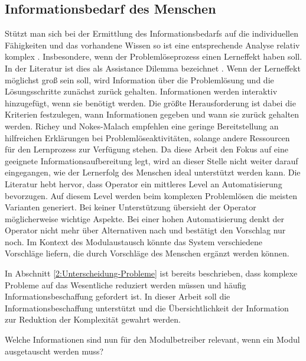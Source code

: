 \subsection{Informationsbedarf des Menschen}
\label{3:Informationsbedarf-Operator}
Stützt man sich bei der Ermittlung des Informationsbedarfs auf die individuellen Fähigkeiten und das vorhandene Wissen so ist eine entsprechende Analyse relativ komplex . Insbesondere, wenn der Problemlöseprozess einen Lerneffekt haben soll. In der Literatur ist dies als Assistance Dilemma bezeichnet . Wenn der Lerneffekt möglichst groß sein soll, wird Information über die Problemlösung und die Lösungsschritte zunächst zurück gehalten. Informationen werden interaktiv hinzugefügt, wenn sie benötigt werden. Die größte Herausforderung ist dabei die Kriterien festzulegen, wann Informationen gegeben und wann sie zurück gehalten werden\cite{Koedinger2007}.  Richey und Nokes-Malach \cite{Richey2013} empfehlen eine geringe Bereitstellung an hilfreichen Erklärungen bei Problemlöseaktivitäten, solange andere Ressourcen für den Lernprozess zur Verfügung stehen. Da diese Arbeit den Fokus auf eine geeignete Informationsaufbereitung legt, wird an dieser Stelle nicht weiter darauf eingegangen, wie der Lernerfolg des Menschen ideal unterstützt werden kann. Die Literatur \cite{Miller2005, Sauer2018} hebt hervor, dass Operator ein mittleres Level an Automatisierung bevorzugen. Auf diesem Level werden beim komplexen Problemlösen die meisten Varianten generiert. Bei keiner Unterstützung übersieht der Operator möglicherweise wichtige Aspekte. Bei einer hohen Automatisierung denkt der Operator nicht mehr über Alternativen nach und bestätigt den Vorschlag nur noch. \cite{Miller2005} Im Kontext des Modulaustausch könnte das System verschiedene Vorschläge liefern, die durch Vorschläge des Menschen ergänzt werden können.

In Abschnitt \ref{2:Unterscheidung-Probleme} ist bereits beschrieben, dass komplexe Probleme auf das Wesentliche reduziert werden müssen und häufig Informationsbeschaffung gefordert ist. In dieser Arbeit soll die Informationsbeschaffung unterstützt und die Übersichtlichkeit der Information zur Reduktion der Komplexität gewahrt werden.

Welche Informationen sind nun für den Modulbetreiber relevant, wenn ein Modul ausgetauscht werden muss?

